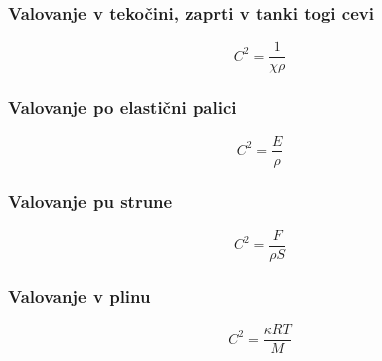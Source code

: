 \subsubsection*{Valovanje v tekočini, zaprti v tanki togi cevi}
\[C^2 = \frac{1}{\chi \rho}\]

\subsubsection*{Valovanje po elastični palici}
\[C^2 = \frac{E}{\rho}\]

\subsubsection*{Valovanje pu strune}
\[C^2 = \frac{F}{\rho S}\]

\subsubsection*{Valovanje v plinu}
\[C^2 = \frac{\kappa RT}{M}\]




